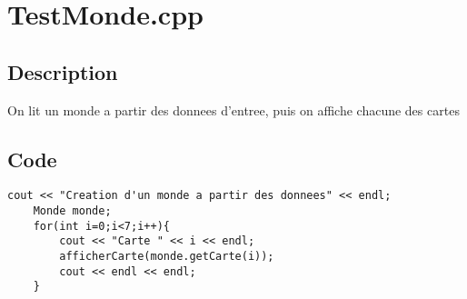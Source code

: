 \section{TestMonde.cpp}
        \subsection{Description}
            On lit un monde a partir des donnees d'entree, puis on affiche chacune des cartes
        \subsection{Code}
\begin{lstlisting}
cout << "Creation d'un monde a partir des donnees" << endl;
	Monde monde;
	for(int i=0;i<7;i++){
		cout << "Carte " << i << endl;
		afficherCarte(monde.getCarte(i));
		cout << endl << endl;
	}
	\end{lstlisting}

